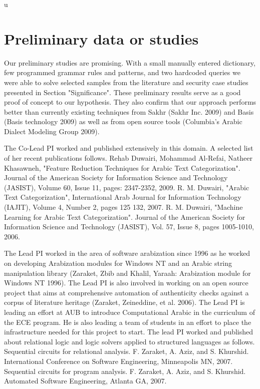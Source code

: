\documentclass[12pt]{article}
\begin{document}
\pagebreak
u
\section{Preliminary data or studies}
\label{s:prelim}

Our preliminary studies are promising. With a small manually entered dictionary, few programmed grammar rules and patterns, and two hardcoded queries we were able to solve selected samples from the literature and security case studies presented in Section "Significance". 
These preliminary results serve as a good proof of concept to our hypothesis. They also confirm that our approach performs better than currently existing techniques from Sakhr (Sakhr Inc. 2009) and Basis (Basis technology 2009) as well as from open source tools (Columbia's Arabic Dialect Modeling Group 2009).


The Co-Lead PI worked and published extensively in this domain. A selected list of her recent publications follows. 
    Rehab Duwairi, Mohammad Al-Refai, Natheer Khasawneh, "Feature Reduction Techniques for Arabic Text Categorization". Journal of the American Society for Information Science and Technology (JASIST), Volume 60, Issue 11, pages: 2347-2352, 2009. 
        R. M. Duwairi, "Arabic Text Categorization", International Arab Journal for Information Technology (IAJIT), Volume 4, Number 2, pages 125  132, 2007.
            R. M. Duwairi, "Machine Learning for Arabic Text Categorization". Journal of the American Society for Information Science and Technology (JASIST), Vol. 57, Issue 8, pages 1005-1010, 2006.


The Lead PI worked in the area of software arabization since 1996 as he worked on developing Arabization modules for Windows NT and an Arabic string manipulation library (Zaraket, Zbib and Khalil, Yaraah: Arabization module for Windows NT 1996). The Lead PI is also involved in working on an open source project that aims at comprehensive automation of authenticity checks against a corpus of literature heritage (Zaraket, Zeineddine, et al. 2006). The Lead PI is leading an effort at AUB to introduce Computational Arabic in the curriculum of the ECE program. He is also leading a team of students in an effort to place the infrastructure needed for this project to start. 
            The lead PI worked and published about relational logic and logic solvers applied to structured languages as follows.
                Sequential circuits for relational analysis. F. Zaraket, A. Aziz, and S. Khurshid. International Conference on Software Engineering, Minneapolis MN, 2007. 
                    Sequential circuits for program analysis. F. Zaraket, A. Aziz, and S. Khurshid. Automated Software Engineering, Atlanta GA, 2007. 
\end{document}
